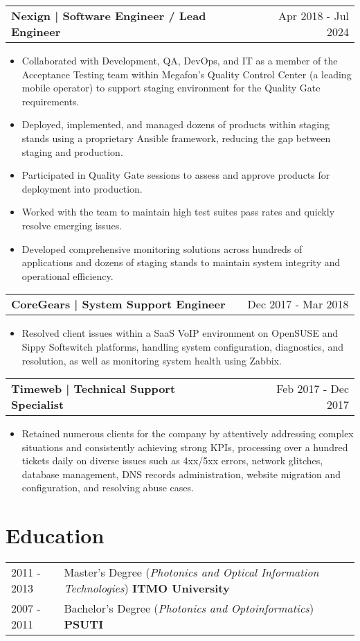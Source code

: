\documentclass[a4paper,12pt]{article}
\makeatletter
\newenvironment{joblong}[2]
    {
    \begin{tabularx}{\linewidth}{@{}l X r@{}}
    \textbf{#1} & \hfill &  #2 \\[3.75pt]
    \end{tabularx}
    \begin{minipage}[t]{\linewidth}
    \begin{itemize}[nosep,after=\strut, leftmargin=1em, itemsep=3pt,label=--]
    }
    {
    \end{itemize}
    \end{minipage}    
    }
\makeatother
\begin{document}
\begin{joblong}{Nexign | Software Engineer / Lead Engineer}{Apr 2018 - Jul 2024}
\item Collaborated with Development, QA, DevOps, and IT as a member of the Acceptance Testing team within Megafon’s Quality Control Center (a leading mobile operator) to support staging environment for the Quality Gate requirements.
\item Deployed, implemented, and managed dozens of products within staging stands using a proprietary Ansible framework, reducing the gap between staging and production.
\item Participated in Quality Gate sessions to assess and approve products for deployment into production.
\item Worked with the team to maintain high test suites pass rates and quickly resolve emerging issues.
\item Developed comprehensive monitoring solutions across hundreds of applications and dozens of staging stands to maintain system integrity and operational efficiency.
\end{joblong}

\begin{joblong}{CoreGears | System Support Engineer}{Dec 2017 - Mar 2018}
\item Resolved client issues within a SaaS VoIP environment on OpenSUSE and Sippy Softswitch platforms, handling system configuration, diagnostics, and resolution, as well as monitoring system health using Zabbix.
\end{joblong}

\begin{joblong}{Timeweb | Technical Support Specialist}{Feb 2017 - Dec 2017}
\item Retained numerous clients for the company by attentively addressing complex situations and consistently achieving strong KPIs, processing over a hundred tickets daily on diverse issues such as 4xx/5xx errors, network glitches, database management, DNS records administration, website migration and configuration, and resolving abuse cases.
\end{joblong}

\section{Education}
\begin{tabularx}{\linewidth}{@{}l X@{}}	
2011 - 2013 & Master’s Degree (\textit{Photonics and Optical Information Technologies}) \hfill \textbf{ITMO University}  \\ 
2007 - 2011 & Bachelor's Degree (\textit{Photonics and Optoinformatics}) \hfill \textbf{PSUTI} \\ 
\end{tabularx}
\end{document}

